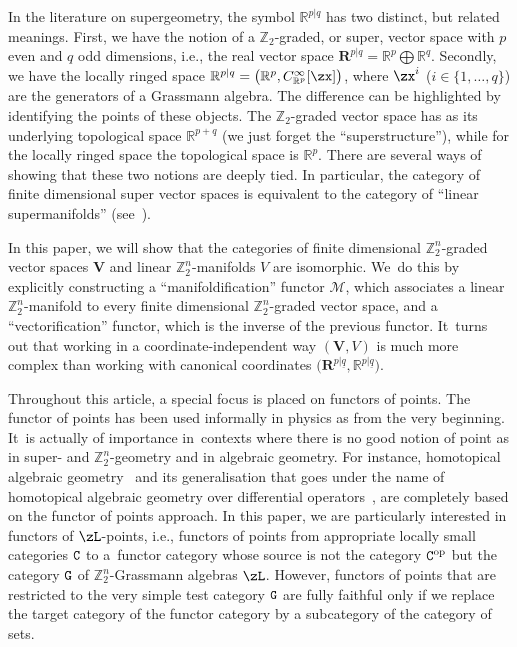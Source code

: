 \documentclass[10pt,a4paper]{amsart}
\newcommand{\op}[1]{\operatorname{#1}}
\newcommand{\R}{{\mathbb R}}
\newcommand{\Z}{{\mathbb Z}}
\def\ul{\underline}
\def\ul{\underline}
\newcommand{\0}{\otimes}
\newcommand{\z}{\Z_2^n}
\numberwithin{equation}{section}
\begin{document}
In the literature on supergeometry, the symbol $\R^{p|q}$ has two distinct, but related meanings. First, we have the notion of a $\Z_2$-graded, or super, vector space with $p$ even and $q$ odd dimensions, i.e., the real vector space $\mathbf{R}^{p|q}=\R^p \bigoplus \R^q$. Secondly, we have the locally ringed space $\R^{p|q}=\big( \R^p, C^\infty_{\R^p}[\zx]\big)$, where $\zx^i$ ($i\in\{1, \dots, q\}$) are the generators of a Grassmann algebra. The difference can be highlighted by identifying the points of these objects. The $\Z_2$-graded vector space has as its underlying topological space $\R^{p+q}$ (we just forget the ``superstructure''), while for the locally ringed space the topological space is $\R^p$. There are several ways of showing that these two notions are deeply tied. In particular, the category of finite dimensional super vector spaces is equivalent to the category of ``linear supermanifolds'' (see~\cite{Bernstein:2013,Kostant:1977, Leites:1980, Leites:1991,Sanchez-Valenzuela:1988}).

In this paper, we will show that the categories of finite dimensional $\z$-graded vector spaces $\mathbf{V}$ and linear $\z$-manifolds $V$ are isomorphic. We~do this by explicitly constructing a ``manifoldification'' functor $\mathcal{M}$, which associates a linear $\z$-manifold to every finite dimensional $\Z_2^n$-graded vector space, and a ``vectorification'' functor, which is the inverse of the previous functor. It~turns out that working in a coordinate-independent way $(\mathbf{V}, V)$ is much more complex than working with canonical coordinates $\big(\mathbf{R}^{p|\ul q},\R^{p|\ul q}\big)$.

Throughout this article, a special focus is placed on functors of points. The functor of points has been used informally in physics as from the very beginning. It~is actually of importance in~contexts where there is no good notion of point as in super- and $\Z_2^n$-geometry and in algebraic geometry. For instance, homotopical algebraic geometry~\cite{TVI, TVII} and its generalisation that goes under the name of homotopical algebraic geometry over differential operators~\cite{BPP:KTR, BPP:HAC}, are completely based on the functor of points approach. In this paper, we are particularly interested in functors of $\zL$-points, i.e., functors of points from appropriate locally small categories $\tt C$ to a~functor category whose source is not the category ${\tt C}^{\op{op}}$ but the category ${\tt G}$ of $\z$-Grassmann algebras $\zL$. However, functors of points that are restricted to the very simple test category ${\tt G}$ are fully faithful only if we replace the target category of the functor category by a subcategory of the category of sets.
\end{document}
